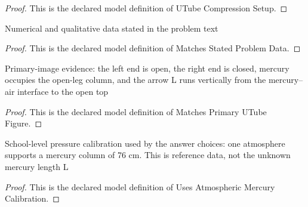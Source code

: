 \begin{proof}
  This is the declared model definition of UTube Compression Setup.
\end{proof}
\begin{definition}
  \label{def:physics:phyx-mini-0366:phyxminiproblems-problemphyxmini0366-matchesstatedproblemdata}
  Numerical and qualitative data stated in the problem text
\end{definition}
\begin{proof}
  This is the declared model definition of Matches Stated Problem Data.
\end{proof}
\begin{definition}
  \label{def:physics:phyx-mini-0366:phyxminiproblems-problemphyxmini0366-matchesprimaryutubefigure}
  Primary-image evidence: the left end is open, the right end is closed, mercury occupies the open-leg column, and the arrow L runs vertically from the mercury--air interface to the open top
\end{definition}
\begin{proof}
  This is the declared model definition of Matches Primary UTube Figure.
\end{proof}
\begin{definition}
  \label{def:physics:phyx-mini-0366:phyxminiproblems-problemphyxmini0366-usesatmosphericmercurycalibration}
  School-level pressure calibration used by the answer choices: one atmosphere supports a mercury column of 76 cm. This is reference data, not the unknown mercury length L
\end{definition}
\begin{proof}
  This is the declared model definition of Uses Atmospheric Mercury Calibration.
\end{proof}

